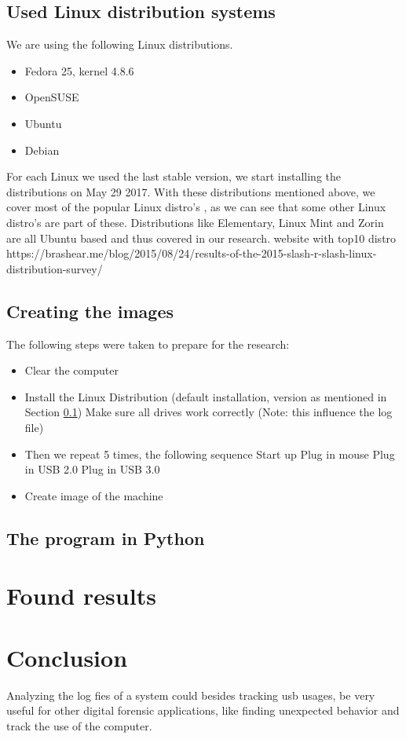 \documentclass[a4paper]{article}
\begin{document}
\subsection{Used Linux distribution systems}\label{sec:usedLinux}
We are using the following Linux distributions.
\begin{itemize}
\item Fedora 25, kernel 4.8.6
\item OpenSUSE
\item Ubuntu
\item Debian
\end{itemize}
For each Linux we used the last stable version, we start installing the
distributions on May 29 2017. With these distributions mentioned above, we cover
most of the popular Linux distro's \cite{LinuxDistro}, as we can see that some
other Linux distro's are part of these. Distributions like Elementary, Linux
Mint and  Zorin are all Ubuntu based and thus covered in our research. %
website with top10 distro
https://brashear.me/blog/2015/08/24/results-of-the-2015-slash-r-slash-linux-distribution-survey/

\subsection{Creating the images}\label{sec:createImage}
The following steps were taken to prepare for the research:
\begin{itemize}
\item Clear the computer
\item Install the Linux Distribution (default installation, version as mentioned in Section \ref{sec:usedLinux})
\subitem Make sure all drives work correctly (Note: this influence the log file)
\item Then we repeat 5 times, the following sequence
\subitem Start up
\subitem Plug in mouse
\subitem Plug in USB 2.0
\subitem Plug in USB 3.0
\item Create image of the machine
\end{itemize}

\subsection{The program in Python}\label{sec:python}


\section{Found results}
\label{sec:goals}


\section{Conclusion}
\label{sec:concl}



Analyzing the log fies of a system could besides tracking usb usages, be very
useful for other digital forensic applications, like finding unexpected behavior
and track the use of the computer.




\end{document}
